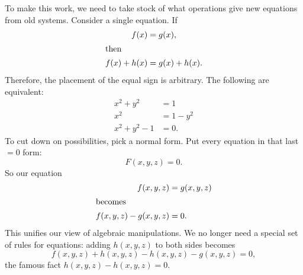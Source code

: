 \documentclass[a5paper]{scrartcl}
\theoremstyle{nonumberplain}
\begin{document}
To make this work, we need to take stock of what operations give new equations from old systems. Consider a single equation. If
\begin{align*}
  f(x)&=g(x),\\
  \shortintertext{then}
  f(x)+h(x) &= g(x) + h(x).
\end{align*}
Therefore, the placement of the equal sign is arbitrary. The following are equivalent:
\begin{align}
  x^2 +y^2 &= 1\nonumber \\
  x^2 &= 1 - y^2\nonumber \\
  x^2 + y^2 - 1 &= 0.
\end{align}
To cut down on possibilities, pick a normal form. Put every equation in that last \(=0\) form:
\[
  F(x,y,z) = 0.
\]
So our equation
\begin{align*}
  f(x,y,z) &= g(x,y,z) \\
  \shortintertext{becomes}
  f(x,y,z)-g(x,y,z) &=0.
\end{align*}
This unifies our view of algebraic manipulations. We no longer need a special set of rules for equations:
adding \(h(x,y,z)\) to both sides becomes
\[
  f(x,y,z) + h(x,y,z) -h(x,y,z) - g(x,y,z) =0,
\]
the famous fact \(h(x,y,z)-h(x,y,z)=0\).
\end{document}
